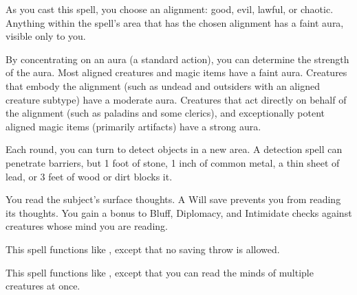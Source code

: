 \begin{spelleffect}
    As you cast this spell, you choose an alignment: good, evil, lawful, or chaotic. Anything within the spell's area that has the chosen alignment has a faint aura, visible only to you.
    
    By concentrating on an aura (a standard action), you can determine the strength of the aura. Most aligned creatures and magic items have a faint aura. Creatures that embody the alignment (such as undead and outsiders with an aligned creature subtype) have a moderate aura. Creatures that act directly on behalf of the alignment (such as paladins and some clerics), and exceptionally potent aligned magic items (primarily artifacts) have a strong aura.
\end{spelleffect}
\begin{spellnotes}
  Each round, you can turn to detect objects in a new area. A detection spell can penetrate barriers, but 1 foot of stone, 1 inch of common metal, a thin sheet of lead, or 3 feet of wood or dirt blocks it.
\end{spellnotes}

\spellrng{\rngmed}
\begin{spelleffect}
  You read the subject's surface thoughts. A Will save prevents you from reading its thoughts. You gain a  bonus to Bluff, Diplomacy, and Intimidate checks against creatures whose mind you are reading.
\end{spelleffect}

\begin{spelleffect}
    This spell functions like , except that no saving throw is allowed.
\end{spelleffect}

\begin{spelleffect}
    This spell functions like , except that you can read the minds of multiple creatures at once. 
\end{spelleffect}

